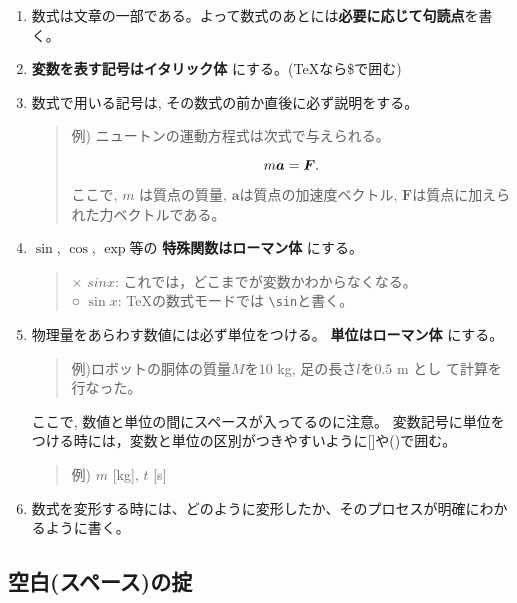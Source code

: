 \documentclass[12pt, ]{jsarticle}
\begin{document}
\begin{enumerate}
\item
  数式は文章の一部である。よって数式のあとには\textbf{必要に応じて句読点}を書く。
\item
  \textbf{変数を表す記号はイタリック体} にする。(TeXなら\$で囲む)
\item
  数式で用いる記号は, その数式の前か直後に必ず説明をする。

  \begin{quote}
  例) ニュートンの運動方程式は次式で与えられる。

  \[m\boldsymbol{a}=\boldsymbol{F}.\noindent\]

  ここで, \(m\) は質点の質量, \(\boldsymbol{a}\)は質点の加速度ベクトル,
  \(\boldsymbol{F}\)は質点に加えられた力ベクトルである。
  \end{quote}
\item
  \(\sin\), \(\cos\), \(\exp\)等の \textbf{特殊関数はローマン体}
  にする。

  \begin{quote}
  × \(sin x\): これでは，どこまでが変数かわからなくなる。\\
  ○ \(\sin x\): TeXの数式モードでは
  \passthrough{\lstinline!\\sin!}と書く。
  \end{quote}
\item
  物理量をあらわす数値には必ず単位をつける。 \textbf{単位はローマン体}
  にする。

  \begin{quote}
  例)ロボットの胴体の質量\(M\)を\(10\) kg, 足の長さ\(l\)を\(0.5\) m とし
  て計算を行なった。
  \end{quote}

  ここで, 数値と単位の間にスペースが入ってるのに注意。
  変数記号に単位をつける時には，変数と単位の区別がつきやすいように{[}{]}や()で囲む。

  \begin{quote}
  例) \(m\) {[}kg{]}, \(t\) {[}s{]}
  \end{quote}
\item
  数式を変形する時には、どのように変形したか、そのプロセスが明確にわかるように書く。
\end{enumerate}

\hypertarget{ux7a7aux767dux30b9ux30daux30fcux30b9ux306eux639f}{%
\subsection{空白(スペース)の掟}\label{ux7a7aux767dux30b9ux30daux30fcux30b9ux306eux639f}}
\end{document}
